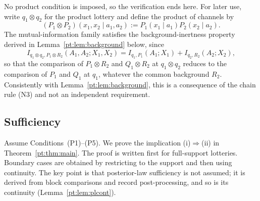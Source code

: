 \documentclass[11pt,a4paper]{article}
\theoremstyle{definition}
\newcommand{\1}{\mathbf 1}
\begin{document}
No product condition is imposed, so the verification ends here.  For later use, write $q_1\otimes q_2$ for the product
lottery and define the product of channels by
\[
(P_1\otimes P_2)(x_1,x_2\mid a_1,a_2)
:=P_1(x_1\mid a_1)P_2(x_2\mid a_2).
\]
The mutual-information family satisfies the background-inertness property derived in Lemma~\ref{pt:lem:background} below,
since
\[
I_{q_1\otimes q_2,P_1\otimes R_2}(A_1,A_2;X_1,X_2)
=
I_{q_1,P_1}(A_1;X_1)+I_{q_2,R_2}(A_2;X_2),
\tag{N4}
\]
so that the comparison of $P_1\otimes R_2$ and $Q_1\otimes R_2$ at $q_1\otimes q_2$ reduces to the comparison of $P_1$
and $Q_1$ at $q_1$, whatever the common background $R_2$.  Consistently with Lemma~\ref{pt:lem:background}, this is a
consequence of the chain rule (N3) and not an independent requirement.

\subsection{Sufficiency}

Assume Conditions~\textup{(P1)--(P5)}.  We prove the implication \textup{(i)$\Rightarrow$(ii)} in
Theorem~\ref{pt:thm:main}.  The proof is written first for full-support lotteries.  Boundary cases are obtained by
restricting to the support and then using continuity.  The key point is that posterior-law sufficiency is not assumed; it
is derived from block comparisons and record post-processing, and so is its continuity
(Lemma~\ref{pt:lem:plcont}).
\end{document}
